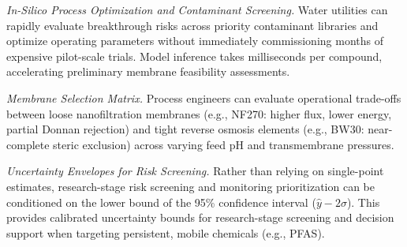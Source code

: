 \documentclass[11pt]{article}
\begin{document}
\textit{In-Silico Process Optimization and Contaminant Screening.} Water utilities can rapidly evaluate breakthrough risks across priority contaminant libraries and optimize operating parameters without immediately commissioning months of expensive pilot-scale trials. Model inference takes milliseconds per compound, accelerating preliminary membrane feasibility assessments.

\textit{Membrane Selection Matrix.} Process engineers can evaluate operational trade-offs between loose nanofiltration membranes (e.g., NF270: higher flux, lower energy, partial Donnan rejection) and tight reverse osmosis elements (e.g., BW30: near-complete steric exclusion) across varying feed pH and transmembrane pressures.

\textit{Uncertainty Envelopes for Risk Screening.} Rather than relying on single-point estimates, research-stage risk screening and monitoring prioritization can be conditioned on the lower bound of the 95\% confidence interval ($\hat{y} - 2\sigma$). This provides calibrated uncertainty bounds for research-stage screening and decision support when targeting persistent, mobile chemicals (e.g., PFAS).
\end{document}

